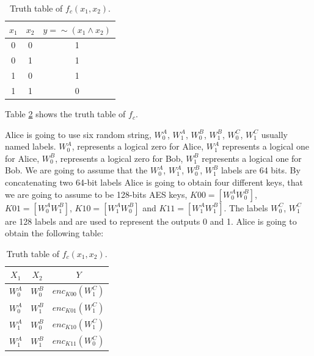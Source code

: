 \begin{refsection}
\begin{table}[H]
\centering
\begin{tabular}{|c|c|c|}
\hline
$x_1$           & $x_2$             & $y=\sim \left(x_1 \wedge x_2\right)$  \\ \hline
0               & 0                 & 1                                     \\ \hline
0               & 1                 & 1                                     \\ \hline
1               & 0                 & 1                                     \\ \hline
1               & 1                 & 0                                     \\ \hline
\end{tabular}
\caption{Truth table of $f_c(x_1,x_2)$.}\label{tb:truthtable}
\end{table}

Table \ref{tb:truthtable} shows the truth table of $f_c$.

Alice is going to use six random string, $W_0^A$, $W_1^A$, $W_0^B$, $W_1^B$, $W_0^C$, $W_1^C$ usually named labels. $W_0^A$, represents a logical zero for Alice, $W_1^A$ represents a logical one for Alice, $W_0^B$, represents a logical zero for Bob, $W_1^B$ represents a logical one for Bob.
We are going to assume that the $W_0^A$, $W_1^A$, $W_0^B$, $W_1^B$ labels are 64 bits. By concatenating two 64-bit labels Alice is going to obtain four different keys, that we are going to assume to be 128-bits AES keys, $K00 = \left[ W_0^A W_0^B \right] $, $K01 = \left[ W_0^A W_1^B \right] $, $K10 = \left[ W_1^A W_0^B \right]$ and $K11 = \left[ W_1^A W_1^B \right]$. The labels $W_0^C$, $W_1^C$ are 128 labels and are used to represent the outputs 0 and 1. Alice is going to obtain the following table:

\begin{table}[H]
\centering
\begin{tabular}{|c|c|c|}
\hline
$X_1$                 & $X_2$                   & $Y$  \\ \hline
$W_0^A$               & $W_0^B$                 & $enc_{K00} \left(W_1^C\right)$    \\ \hline
$W_0^A$               & $W_1^B$                 & $enc_{K01} \left(W_1^C\right)$    \\ \hline
$W_1^A$               & $W_0^B$                 & $enc_{K10} \left(W_1^C\right)$    \\ \hline
$W_1^A$               & $W_1^B$                 & $enc_{K11} \left(W_0^C\right)$    \\ \hline
\end{tabular}
\caption{Truth table of $f_c(x_1,x_2)$.}\label{tb:truthtable}
\end{table}


\end{refsection}
